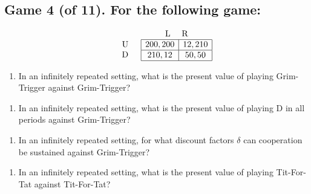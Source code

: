 \documentclass[11pt]{article}
\begin{document}
\pagebreak

\subsection*{Game 4 (of 11). For the following game:
}
$$
\begin{array}{lccc}
    & & & \text{L} \ \ \ \ \text{R}\\
    & &
    \begin{array}{r}
        \text{U} \\
        \text{D} \\
    \end{array} &
    \begin{array}{|c|c|}
        \hline
        200,200 & 12,210 \\
        \hline
        210,12 & 50,50 \\
        \hline
    \end{array}
\end{array}
$$



\begin{enumerate}[label=\alph*), start=1]
\item  In an infinitely repeated setting, what is the present value of playing Grim-Trigger against Grim-Trigger?

\end{enumerate}
\hfill \raisebox{-1ex}{\rule{4.2cm}{1pt}}

\vspace{1cm}

\begin{enumerate}[label=\alph*), start=2]
\item  In an infinitely repeated setting, what is the present value of playing D in all periods against Grim-Trigger? \hfill \raisebox{-1ex}{\rule{4.2cm}{1pt}}

\end{enumerate}
\vspace{1cm}

\begin{enumerate}[label=\alph*), start=3]
\item  In an infinitely repeated setting, for what discount factors $\delta$ can cooperation be sustained against Grim-Trigger? \hfill \raisebox{-1ex}{\rule{4.2cm}{1pt}}

\end{enumerate}
\vspace{2cm}

\begin{enumerate}[label=\alph*), start=4]
\item  In an infinitely repeated setting, what is the present value of playing Tit-For-Tat against Tit-For-Tat? 

\end{enumerate}
\hfill \raisebox{-1ex}{\rule{4.2cm}{1pt}}
\end{document}
